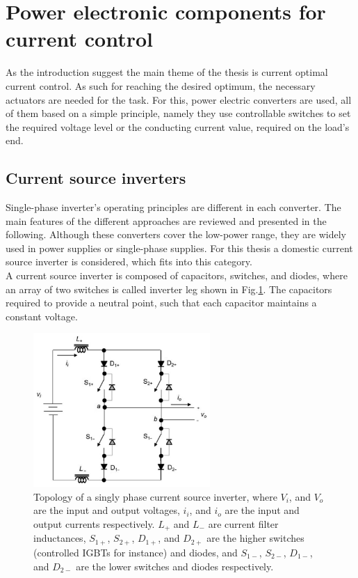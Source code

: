 \section{Power electronic components for current control}

As the introduction suggest the main theme of the thesis is current optimal current control. As such for reaching the desired optimum, the necessary actuators are needed for the task. For this, power electric converters are used, all of them based on a simple principle, namely they use controllable switches to set the required voltage level or the conducting current value, required on the load's end.

\subsection{Current source inverters}\label{BASICCSR:sec:CSI}

Single-phase inverter's operating principles are different in each converter. The main features of the different approaches are reviewed and presented in the following. Although these converters cover the low-power range, they are widely used in power supplies or single-phase supplies. For this thesis a domestic current source inverter is considered, which fits into this category.\\
A current source inverter is composed of capacitors, switches, and diodes, where an array of two switches is called inverter leg shown in Fig.\ref{BASICCSR:fig:SingleCSI}. The capacitors required to provide a neutral point, such that each capacitor maintains a constant voltage.

\begin{figure}[!ht]
        \centering
        \includegraphics[width=0.6\textwidth]{EMPC_PNG_Pics/CurrentSourceInverter.png}
        \caption{Topology of a singly phase current source inverter, where $V_i$, and $V_o$ are the input and output voltages, $i_i$, and $i_o$ are the input and output currents respectively. $L_+$ and $L_-$ are current filter inductances, $S_{1+}$, $S_{2+}$, $D_{1+}$, and $D_{2+}$ are the higher switches (controlled IGBTs for instance) and diodes, and $S_{1-}$, $S_{2-}$, $D_{1-}$, and $D_{2-}$ are the lower switches and diodes respectively.}
        \label{BASICCSR:fig:SingleCSI}
    \end{figure}

